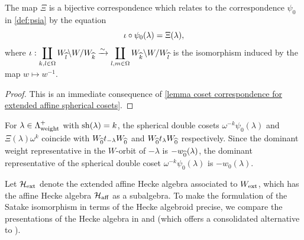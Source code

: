 \begin{lemma}\label{lemma Xi vs psi}
The map $\Xi$ is a bijective correspondence
which relates to the correspondence $\psi_0$ in \cref{def:psia} by the equation
$$\iota\circ\psi_0(\lambda)=\Xi(\lambda),$$
where $\iota: \displaystyle \coprod_{k, l \in \Omega} W_{\widehat{l}}\backslash W/W_{\widehat{k}} \xrightarrow{\sim} \coprod_{l,m \in \Omega}W_{\widehat{k}}\backslash W/W_{\widehat{l}}$ is the isomorphism induced by the map $w \mapsto w^{-1}$.
\end{lemma}
\begin{proof}
    This is an immediate consequence of \cref{lemma coset correspondence for extended affine spherical cosets}.
\end{proof}

\begin{remark}\label{rmk coset mismatch}
    For $\lambda \in \Lambda_{\operatorname{weight}}^+$ with $\operatorname{sh}(\lambda)=k$, the spherical double cosets $\omega^{-k}\psi_0(\lambda)$ and $\Xi(\lambda)\omega^k$ coincide with $W_{\widehat{0}}t_{-\lambda}W_{\widehat{0}}$ and $W_{\widehat{0}}t_{\lambda}W_{\widehat{0}}$ respectively. 
    Since the dominant weight representative in the $W$-orbit of $-\lambda$ is $-w_{\widehat{0}}(\lambda)$,  the dominant representative of the spherical double coset $\omega^{-k}\psi_0(\lambda)$ is $-w_0(\lambda)$.
\end{remark}

Let $\mathcal{H}_{\operatorname{ext}}$ denote the extended affine Hecke algebra associated to $W_{\operatorname{ext}}$, which has the affine Hecke algebra $\mathcal{H}_{\operatorname{aff}}$ as a subalgebra. 
To make the formulation of the Satake isomorphism in terms of the Hecke algebroid precise, we compare the presentations of the Hecke algebra in \cite{WillSingular}  and \cite{Ach} (which offers a consolidated alternative to \cite{LusztigGS}).

